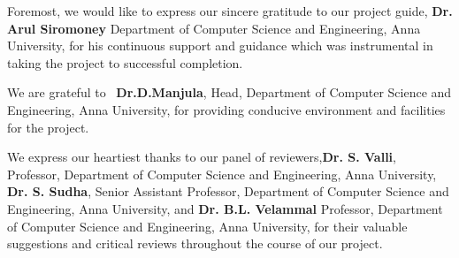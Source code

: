 Foremost, we would like to express our sincere gratitude to our project guide, \textbf{Dr. Arul Siromoney} Department of Computer Science and Engineering, Anna University, for his continuous support and guidance which was instrumental in taking the project to successful completion.

We are grateful to  \textbf{Dr.D.Manjula}, Head, Department of Computer Science and Engineering, Anna University, for providing conducive environment and facilities for the project.

We express our heartiest thanks to our panel of reviewers,\linebreak  \textbf{Dr. S. Valli}, Professor, Department of Computer Science and Engineering, Anna University, \textbf{Dr. S. Sudha}, Senior Assistant Professor, Department of Computer Science and Engineering, Anna University, and \textbf{Dr. B.L. Velammal} Professor, Department of Computer Science and Engineering, Anna University, for their valuable suggestions and critical reviews throughout the course of our project.